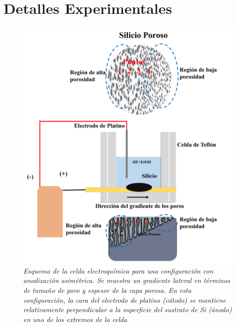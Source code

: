\documentclass[a4paper,11pt,]{book}
\begin{document}
\section{Detalles Experimentales}
\begin{figure}[H]
	\centering
	\includegraphics[scale=.3]{../Images/EPS0}
	\caption{\emph{Esquema de la celda electroquímica  para una configuración con anodización asimétrica. Se muestra  un gradiente lateral en términos de tamaño de poro y espesor de la capa porosa. En esta configuración, la cara del electrodo de platino (cátodo) se mantiene relativamente perpendicular a la superficie del sustrato de Si (ánodo) en uno de los extremos de la celda  }}
	\label{fig:p0}
\end{figure}
\end{document}
